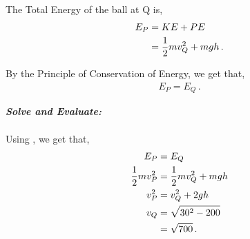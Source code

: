 \begin{subquestions}
The Total Energy of the ball at Q is,
\begin{align}
	E_P & = KE + PE \nonumber \\
        & = \frac{1}{2}mv_Q^2 + mgh \,.
\end{align}

By the Principle of Conservation of Energy, we get that,
\begin{align}
	E_P = E_Q \label{2005:q6:EEqn1} \,.
\end{align}




\textbf{\textit{Solve and Evaluate:}} \\ \\
Using , we get that,
\begin{align}
	E_P & = E_Q \nonumber \\
	\frac{1}{2}mv_P^2 & = \frac{1}{2}mv_Q^2 + mgh \nonumber \\
	v_P^2 & = v_Q^2 +2gh \nonumber \\
	v_Q & = \sqrt{30^2 - 200} \nonumber \\
	    & = \sqrt{700} \,.
\end{align}
	
\end{subquestions}